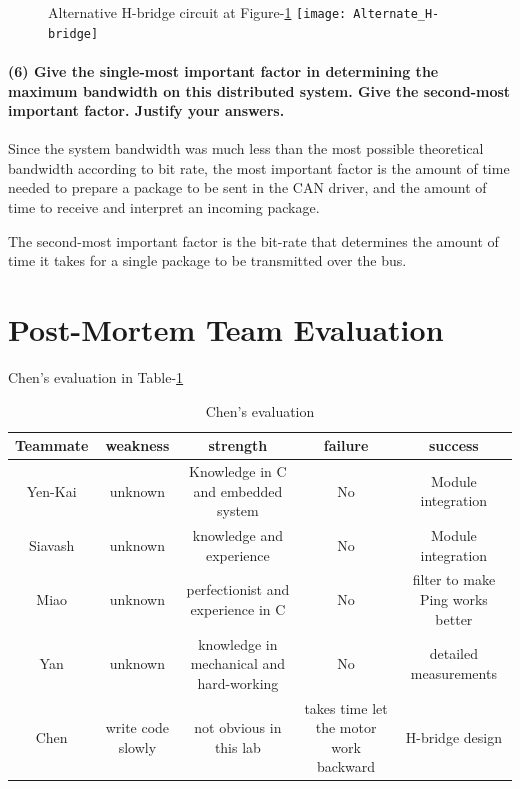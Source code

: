 \documentclass[a4paper]{article}
\newlength{\pic}
\begin{document}
\setlength{\pic}{0.8\textwidth}
\begin{figure}[htp]
\noindent Alternative H-bridge circuit at Figure-\ref{hbridge}
\center
\texttt{[image: Alternate\_H-bridge]}
\caption{ }
\label{hbridge}
\end{figure}

\paragraph{(6) Give the single-most important factor in determining the maximum bandwidth on this distributed system.
Give the second-most important factor. Justify your answers.  \\ }

Since the system bandwidth was much less than the most possible theoretical bandwidth according to bit rate, the most important factor is the amount of time needed to prepare a package to be sent in the CAN driver, and the amount of time to receive and interpret an incoming package.

The second-most important factor is the bit-rate that determines the amount of time it takes for a single package to be transmitted over the bus.

\section{Post-Mortem Team Evaluation}
Chen's evaluation in Table-\ref{tab5}
\begin{table}
\center
\tiny
  \begin{tabular}{|c|c|c|c|c|}
    \hline
    Teammate & weakness & strength & failure & success\\
    \hline
	Yen-Kai & unknown & Knowledge in C and embedded system & No & Module integration\\
	Siavash & unknown & knowledge and experience & No & Module integration\\
	Miao	& unknown & perfectionist and experience in C & No & filter to make Ping works better\\
	Yan		& unknown & knowledge in mechanical and hard-working & No & detailed measurements\\
	Chen	& write code slowly & not obvious in this lab & takes time let the motor work backward & H-bridge design\\
    \hline
  \end{tabular}
  \caption{Chen's evaluation}
  \label{tab5}
\end{table}
\end{document}
